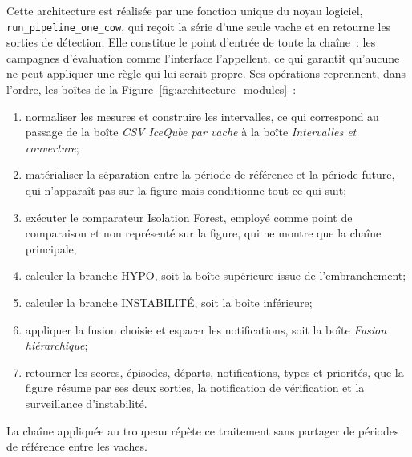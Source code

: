 Cette architecture est réalisée par une fonction unique du noyau logiciel,
\texttt{run\_pipeline\_one\_cow}, qui reçoit la série d'une seule vache et en retourne les
sorties de détection. Elle constitue le point d'entrée de toute la chaîne~: les campagnes
d'évaluation comme l'interface l'appellent, ce qui garantit qu'aucune ne peut appliquer une
règle qui lui serait propre. Ses opérations reprennent, dans l'ordre, les boîtes de la
Figure~\ref{fig:architecture_modules}~:
\begin{enumerate}
  \item normaliser les mesures et construire les intervalles, ce qui correspond au passage
  de la boîte \emph{CSV IceQube par vache} à la boîte \emph{Intervalles et couverture};
  \item matérialiser la séparation entre la période de référence et la période future, qui
  n'apparaît pas sur la figure mais conditionne tout ce qui suit;
  \item exécuter le comparateur Isolation Forest, employé comme point de comparaison et non
  représenté sur la figure, qui ne montre que la chaîne principale;
  \item calculer la branche HYPO, soit la boîte supérieure issue de l'embranchement;
  \item calculer la branche INSTABILITÉ, soit la boîte inférieure;
  \item appliquer la fusion choisie et espacer les notifications, soit la boîte
  \emph{Fusion hiérarchique};
  \item retourner les scores, épisodes, départs, notifications, types et priorités, que la
  figure résume par ses deux sorties, la notification de vérification et la surveillance
  d'instabilité.
\end{enumerate}
La chaîne appliquée au troupeau répète ce traitement sans partager de périodes de référence
entre les vaches.

